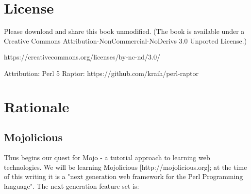 \documentclass[14pt]{extreport}
\begin{document}

\setcounter{page}{2}
\tableofcontents


\chapter*{License}

Please download and share this book unmodified. (The book is available under a
Creative Commons Attribution-NonCommercial-NoDerivs 3.0 Unported License.)

https://creativecommons.org/licenses/by-nc-nd/3.0/

Attribution:
Perl 5 Raptor: https://github.com/kraih/perl-raptor

\chapter*{Rationale}

\section{Mojolicious}

Thus begins our quest for Mojo - a tutorial approach to learning web
technologies. We will be learning Mojolicious [http://mojolicious.org]; at the
time of this writing it is a "next generation web framework for the Perl
Programming language".  The next generation feature set is:
\end{document}
